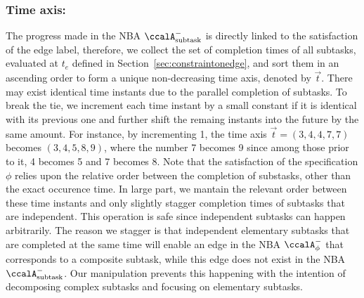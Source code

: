 \documentclass[Afour,sageh,times]{sagej}
\newcommand{\auto}[1]{\ccalA_{\text{#1}}}
\newcommand{\autop}{\ccalA_{\phi}}
\begin{document}
{{  \subsubsection{Time axis:} The progress made in the NBA $\auto{subtask}^-$ is directly linked to the satisfaction of the edge label, therefore, we collect the  set of completion times of all subtasks, evaluated at $t_e$ defined in Section~\ref{sec:constraintonedge}, and sort them in an ascending order to form a unique non-decreasing time axis, denoted by $\vec{t}$. There may exist identical time instants due to the parallel completion of subtasks. To break the tie, we increment each time instant by a small constant if it is identical with its previous one and further shift the remaing instants into the future by the same amount. For instance, by incrementing 1, the time axis $\vec{t}= (3, 4, 4, 7, 7)$ becomes $(3, 4, 5, 8, 9)$, where the number 7 becomes 9 since among those prior to it, 4 becomes 5 and 7 becomes 8.  Note that the satisfaction of  the specification $\phi$ relies upon the relative order between the completion of substasks, other than the exact occurence time. In large part, we mantain the relevant order between these time instants and only slightly stagger completion times of subtasks that are independent. This operation is safe since independent subtasks can happen arbitrarily. The reason we stagger is that independent elementary subtasks that are completed at the same time will enable an edge in the NBA $\autop^-$ that corresponds to a composite subtask, while this edge does not exist in the NBA $\auto{subtask}^-$. Our manipulation prevents this happening with the intention of decomposing complex subtasks and focusing on elementary subtasks.

}}
\end{document}
